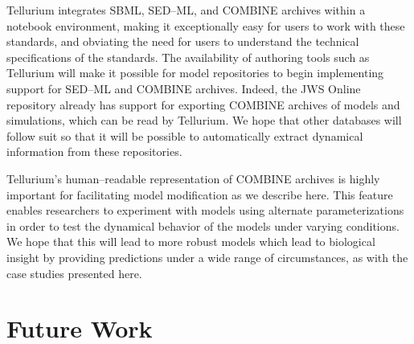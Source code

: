 \documentclass[10pt,letterpaper]{article}
\begin{document}
Tellurium integrates SBML, SED--ML, and COMBINE archives within a notebook environment, making it exceptionally easy for users to work with these standards, and obviating the need for users to understand the technical specifications of the standards. The availability of authoring tools such as Tellurium will make it possible for model repositories to begin implementing support for SED--ML and COMBINE archives. Indeed, the JWS Online repository \cite{olivier2004web} already has support for exporting COMBINE archives of models and simulations, which can be read by Tellurium. We hope that other databases will follow suit so that it will be possible to automatically extract dynamical information from these repositories.



Tellurium's human--readable representation of COMBINE archives is highly important for facilitating model modification as we describe here. This feature enables researchers to experiment with models using alternate parameterizations in order to test the dynamical behavior of the models under varying conditions. We hope that this will lead to more robust models which lead to biological insight by providing predictions under a wide range of circumstances, as with the case studies presented here.

\section*{Future Work}
\end{document}
